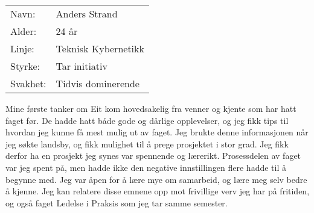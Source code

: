 \begin{table}[H]
\begin{tabular}{l l}
        Navn: & Anders Strand \\
        Alder: & 24 år \\ 
        Linje: & Teknisk Kybernetikk \\
        Styrke: & Tar initiativ \\
        Svakhet: & Tidvis dominerende
    \end{tabular}
\end{table}

Mine første tanker om Eit kom hovedsakelig fra venner og kjente som har hatt faget før.
De hadde hatt både gode og dårlige opplevelser, og jeg fikk tips til hvordan jeg kunne få mest mulig ut av faget. 
Jeg brukte denne informasjonen når jeg søkte landsby, og fikk mulighet til å prege prosjektet i stor grad. 
Jeg fikk derfor ha en prosjekt jeg synes var spennende og lærerikt.
Prosessdelen av faget var jeg spent på, men hadde ikke den negative innstillingen flere hadde til å begynne med. 
Jeg var åpen for å lære mye om samarbeid, og lære meg selv bedre å kjenne. 
Jeg kan relatere disse emnene opp mot frivillige verv jeg har på fritiden, og også faget Ledelse i Praksis som jeg tar samme semester.
